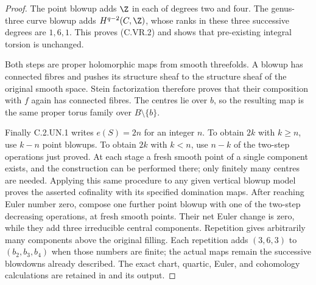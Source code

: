 \begin{proof}
The point blowup adds $\Z$ in each of degrees two and four. The
genus-three curve blowup adds $H^{q-2}(C,\Z)$, whose ranks in these
three successive degrees are $1,6,1$. This proves (C.VR.2) and shows
that pre-existing integral torsion is unchanged.

Both steps are proper holomorphic maps from smooth threefolds. A
blowup has connected fibres and pushes its structure sheaf to the
structure sheaf of the original smooth space. Stein factorization
therefore proves that their composition with $f$ again has connected
fibres. The centres lie over $b$, so the resulting map is the same
proper torus family over $B\setminus\{b\}$.

Finally C.2.UN.1 writes $e(S)=2n$ for an integer $n$. To obtain $2k$
with $k\ge n$, use $k-n$ point blowups. To obtain $2k$ with $k<n$,
use $n-k$ of the two-step operations just proved. At each stage a
fresh smooth point of a single component exists, and the construction
can be performed there; only finitely many centres are needed.
Applying this same procedure to any given vertical blowup model
proves the asserted cofinality with its specified domination maps.
After reaching Euler number zero, compose one further point blowup
with one of the two-step decreasing operations, at fresh smooth
points. Their net Euler change is zero, while they add three
irreducible central components. Repetition gives arbitrarily many
components above the original filling. Each repetition adds
$(3,6,3)$ to $(b_2,b_3,b_4)$ when those numbers are finite; the
actual maps remain the successive blowdowns already described.
The exact chart, quartic, Euler, and cohomology calculations are
retained in  and its output.
\end{proof}
